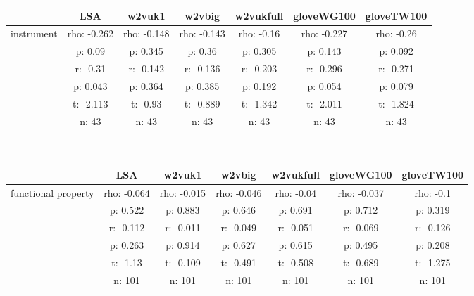 \documentclass{article}
\begin{document}
\begin{tabular}{ccccccc|}\cline{2-7}
&\multicolumn{1}{|c}{LSA} & w2vuk1 & w2vbig & w2vukfull & gloveWG100 & gloveTW100 \\\hline
\multicolumn{1}{|c|}{\multirow{6}{*}{instrument}} & rho: -0.262 & rho: -0.148 & rho: -0.143 & rho: -0.16 & rho: -0.227 & rho: -0.26 \\
\multicolumn{1}{|c|}{} & p: 0.09 & p: 0.345 & p: 0.36 & p: 0.305 & p: 0.143 & p: 0.092 \\
\multicolumn{1}{|c|}{} & r: -0.31 & r: -0.142 & r: -0.136 & r: -0.203 & r: -0.296 & r: -0.271 \\
\multicolumn{1}{|c|}{} & p: 0.043 & p: 0.364 & p: 0.385 & p: 0.192 & p: 0.054 & p: 0.079 \\
\multicolumn{1}{|c|}{} & t: -2.113 & t: -0.93 & t: -0.889 & t: -1.342 & t: -2.011 & t: -1.824 \\
\multicolumn{1}{|c|}{} & n: 43 & n: 43 & n: 43 & n: 43 & n: 43 & n: 43 \\
\hline
\end{tabular}\\
\begin{tabular}{ccccccc|}\cline{2-7}
&\multicolumn{1}{|c}{LSA} & w2vuk1 & w2vbig & w2vukfull & gloveWG100 & gloveTW100 \\\hline
\multicolumn{1}{|c|}{\multirow{6}{*}{functional property}} & rho: -0.064 & rho: -0.015 & rho: -0.046 & rho: -0.04 & rho: -0.037 & rho: -0.1 \\
\multicolumn{1}{|c|}{} & p: 0.522 & p: 0.883 & p: 0.646 & p: 0.691 & p: 0.712 & p: 0.319 \\
\multicolumn{1}{|c|}{} & r: -0.112 & r: -0.011 & r: -0.049 & r: -0.051 & r: -0.069 & r: -0.126 \\
\multicolumn{1}{|c|}{} & p: 0.263 & p: 0.914 & p: 0.627 & p: 0.615 & p: 0.495 & p: 0.208 \\
\multicolumn{1}{|c|}{} & t: -1.13 & t: -0.109 & t: -0.491 & t: -0.508 & t: -0.689 & t: -1.275 \\
\multicolumn{1}{|c|}{} & n: 101 & n: 101 & n: 101 & n: 101 & n: 101 & n: 101 \\
\hline
\end{tabular}\\
\end{document}
